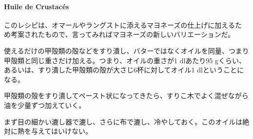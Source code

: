 \begin{recette}
{\paragraph{Huile de Crustacés}\label{huile-de-crustaces}}


このレシピは、オマールやラングストに添えるマヨネーズの仕上げに加えるた
め考案されたもので、言ってみればマヨネーズの新しいバリエーションだ。

使えるだけの甲殻類の殻などをすり潰し、バターではなくオイルを同量、つまり甲殻類と同じ重さだけ加える。つまり、オイルの重さが1
dlあたり95
gくらい、あるいは、すり潰した甲殻類の殻が大さじ6杯に対してオイル1
dlということになる。

甲殻類の殻をすり潰してペースト状になってきたら、すりこ木でよく混ぜながら油を少量ずつ加えていく。

まず目の細かい漉し器で漉し、さらに布で漉し、冷やしておく。このオイルは絶対に熱を与えてはいけない。
\end{recette}